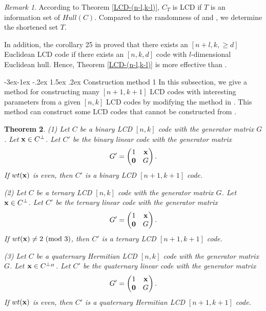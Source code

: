 \documentclass[12pt,twoside]{article}
\makeatletter
\renewcommand\subsection{\@startsection{subsection}{2}{\z@}%
                                     {-3ex\@plus -1ex \@minus -.2ex}%
                                     {1.5ex \@plus .2ex}%
                                     {\normalfont\normalsize\bfseries}}
\theoremstyle{plain}
\newtheorem{theorem}{Theorem}[section]
\theoremstyle{definition}
\theoremstyle{remark}
\newtheorem{remark}[theorem]{Remark}
\makeatother
\begin{document}
\begin{remark}
According to Theorem \ref{LCD-(n-l,k-l)}, $C_T$ is LCD if $T$ is an information set of $Hull(C)$.
Compared to the randomness of \cite{2-LCD-40} and \cite{H-25}, we determine the shortened set $T$.

In addition, the corollary 25 in \cite{LCD-3} proved that there exists an $[n+l,k,\geq d]$ Euclidean LCD code if there exists an $[n,k,d]$ code with $l$-dimensional Euclidean hull. Hence,
Theorem \ref{LCD-(n-l,k-l)} is more effective than \cite[Corollary 25]{LCD-3}.
\end{remark}



\subsection{Construction method 1}
In this subsection, we give a method for constructing many $[n+1,k+1]$ LCD codes with interesting parameters from a given $[n,k]$ LCD codes by modifying the method in \cite{234-lcD}.
This method can construct some LCD codes that cannot be constructed from \cite{234-lcD}.

\begin{theorem}\label{Methods}
{\rm(1)} Let $C$ be a binary LCD $[n,k]$ code with the generator matrix $G$. Let ${\bf x}\in C^\perp$. Let $C'$ be the binary linear code with the generator matrix
$$
G'=\begin{pmatrix}
1 & {\bf x} \\
 {\rm{\bf 0}} & G
\end{pmatrix}.
$$
If $wt({\bf x})$ is even, then $C'$ is a binary LCD $[n+1,k+1]$ code.

{\rm(2)} Let $C$ be a ternary LCD $[n,k]$ code with the generator matrix $G$. Let ${\bf x}\in C^\perp$. Let $C'$ be the ternary linear code with the generator matrix
$$
G'=\begin{pmatrix}
1 & {\bf x} \\
 {\rm{\bf 0}} & G
\end{pmatrix}.
$$
If $wt({\bf x})\neq 2\ ({\rm mod}\ 3)$, then $C'$ is a ternary LCD $[n+1,k+1]$ code.

{\rm(3)} Let $C$ be a quaternary Hermitian LCD $[n,k]$ code with the generator matrix $G$. Let ${\bf x}\in C^{\perp_H}$. Let $C'$ be the quaternary linear code with the generator matrix
$$
G'=\begin{pmatrix}
1 & {\bf x} \\
 {\rm{\bf 0}} & G
\end{pmatrix}.
$$
If $wt({\bf x})$ is even, then $C'$ is a quaternary Hermitian LCD $[n+1,k+1]$ code.
\end{theorem}
\end{document}
